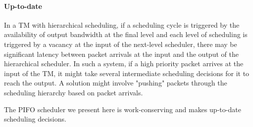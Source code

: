 \paragraph{Up-to-date}
In a TM with hierarchical scheduling, if a scheduling cycle is triggered by the availability of output bandwidth at the final level and each level of scheduling is triggered by a vacancy at the input of the next-level scheduler, there may be significant latency between packet arrivals at the input  and the output of the hierarchical scheduler.  In such a system, if a high priority packet arrives at the input of the TM, it might take several intermediate scheduling decisions for it to reach the output.  A solution might involve "pushing" packets through the scheduling hierarchy based on packet arrivals.  

The PIFO scheduler we present here is work-conserving and makes up-to-date scheduling decisions. 





